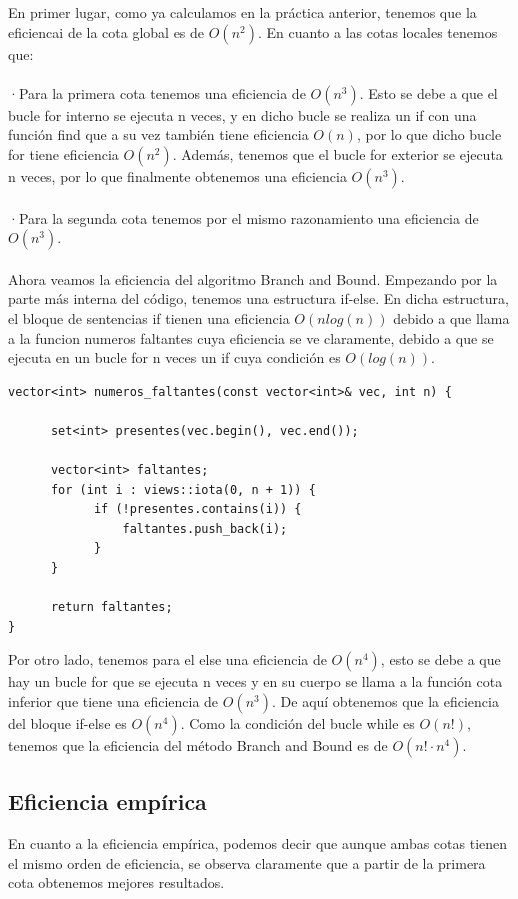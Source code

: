 \documentclass[11pt,openany]{book}
\begin{document}
En primer lugar, como ya calculamos en la práctica anterior, tenemos que la eficiencai de la cota global es de $O(n^2)$. En cuanto a las cotas locales tenemos
que: \\\\
·Para la primera cota tenemos una eficiencia de $O(n^3)$. Esto se debe a que el bucle for interno se ejecuta n veces, y en dicho bucle se realiza un if con 
una función find que a su vez también tiene eficiencia $O(n)$, por lo que dicho bucle for tiene eficiencia $O(n^2)$. Además, tenemos que el bucle for exterior 
se ejecuta n veces, por lo que finalmente obtenemos una eficiencia $O(n^3)$.\\\\
·Para la segunda cota tenemos por el mismo razonamiento una eficiencia de $O(n^3)$.\\\\
Ahora veamos la eficiencia del algoritmo Branch and Bound. Empezando por la parte más interna del código, tenemos una estructura if-else. En dicha estructura,
el bloque de sentencias if tienen una eficiencia $O(nlog(n))$ debido a que llama a la funcion numeros faltantes cuya eficiencia se ve claramente, debido a que 
se ejecuta en un bucle for n veces un if cuya condición es $O(log(n))$.
\begin{lstlisting}
vector<int> numeros_faltantes(const vector<int>& vec, int n) {
            
      set<int> presentes(vec.begin(), vec.end());
        
      vector<int> faltantes;
      for (int i : views::iota(0, n + 1)) {
            if (!presentes.contains(i)) {
                faltantes.push_back(i);
            }
      }
        
      return faltantes;
}
\end{lstlisting}
Por otro lado, tenemos para el else una eficiencia de $O(n^4)$, esto se debe a que hay un bucle for que se ejecuta n veces y en su cuerpo se llama a la función 
cota inferior que tiene una eficiencia de $O(n^3)$. De aquí obtenemos que la eficiencia del bloque if-else es $O(n^4)$. Como la condición del bucle while es $O(n!)$,
tenemos que la eficiencia del método Branch and Bound es de $O(n! \cdot n^4 )$. 

\subsection{Eficiencia empírica}
En cuanto a la eficiencia empírica, podemos decir que aunque ambas cotas tienen el mismo orden de eficiencia, se observa
claramente que a partir de la primera cota obtenemos mejores resultados.
\end{document}
